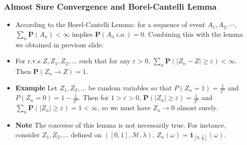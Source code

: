 \documentclass[handout]{beamer}
\newcommand{\BP}{\mathbf{P}}
\newcommand{\BI}{\mathbf{1}}
\begin{document}
\frame
{
  \frametitle{Almost Sure Convergence and Borel-Cantelli Lemma}

   \begin{itemize}
       \item<1-> According to the  Borel-Cantelli Lemma: for a sequence of event $A_1, A_2, \cdots$, $\sum_n \BP(A_n) <\infty$ implies $\BP(A_n \ i.o. )=0$. Combining this with the lemma we obtained in previous slide: 
       
   \item<2->[]     \begin{Lemma} For r.v.s $Z, Z_1, Z_2, \ldots $ such that for any $\varepsilon>0$, $\sum_n \BP(|Z_n-Z| \geq \varepsilon)<\infty$. Then $\BP(Z_n\rightarrow Z)=1$.   \end{Lemma}       

  \item<3-> \textbf{Example} Let $Z_1, Z_2, \ldots$ be random variables so that $P(Z_n=1)=\frac{1}{2^n}$ and $P(Z_n=0)=1-\frac{1}{2^n}$. Then for $1>\varepsilon>0$, $\BP(|Z_n|\geq \varepsilon)=\frac{1}{2^n}$ and $\sum_n \BP(|Z_n|\geq \varepsilon)=1<\infty$, so we must have $Z_n\rightarrow 0$ almost surely. 
  
  
  \item<4-> \textbf{Note}  The converse of this lemma is not necessarily true. For instance, consider $Z_1, Z_2,\ldots$ defined on $([0,1],\mathcal{M}, \lambda)$, $Z_n(\omega)=\BI_{[0,\frac{1}{n}]} (\omega)$.                              
\end{itemize}
}
\end{document}
